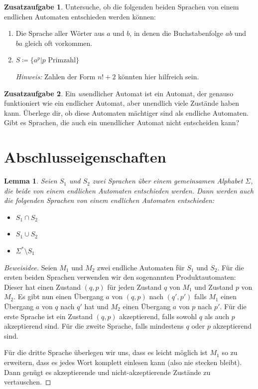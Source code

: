 \documentclass[a4paper,ngerman,12pt]{scrartcl}
\theoremstyle{definition}
\newtheorem{zaufg}{Zusatzaufgabe}
\theoremstyle{plain}
\newtheorem{lemma}[defn]{Lemma}
\theoremstyle{remark}
\begin{document}
\begin{zaufg}
	Untersuche, ob die folgenden beiden Sprachen von einem endlichen Automaten entschieden werden können:
	\begin{enumerate}[label=\alph*)]
		\item Die Sprache aller Wörter aus $a$ und $b$, in denen die Buchstabenfolge $ab$ und $ba$ gleich oft vorkommen.
		\item $S \coloneqq \{a^p | p \text{ Primzahl}\}$
		
		\textit{Hinweis:} Zahlen der Form $n!+2$ könnten hier hilfreich sein.		
	\end{enumerate}
\end{zaufg}

\begin{zaufg}
	Ein \emph{un}endlicher Automat ist ein Automat, der genauso funktioniert wie ein endlicher Automat, aber unendlich viele Zustände haben kann. Überlege dir, ob diese Automaten mächtiger sind als endliche Automaten. Gibt es Sprachen, die auch ein unendlicher Automat nicht entscheiden kann?
\end{zaufg}

\section{Abschlusseigenschaften}

\begin{lemma}\label{lemma:EAAbschlusseigenschaften}
	Seien $S_1$ und $S_2$ zwei Sprachen über einem gemeinsamen Alphabet $\Sigma$, die beide von einem endlichen Automaten entschieden werden. Dann werden auch die folgenden Sprachen von einem endlichen Automaten entschieden:
	\begin{itemize}
		\item $S_1 \cap S_2$
		\item $S_1 \cup S_2$
		\item $\Sigma^* \setminus S_1$
	\end{itemize}
\end{lemma}

\begin{proof}[Beweisidee]
	Seien $M_1$ und $M_2$ zwei endliche Automaten für $S_1$ und $S_2$. Für die ersten beiden Sprachen verwenden wir den sogenannten Produktautomaten: Dieser hat einen Zustand $(q,p)$ für jeden Zustand $q$ von $M_1$ und Zustand $p$ von $M_2$. Es gibt nun einen Übergang $a$ von $(q,p)$ nach $(q',p')$ falls $M_1$ einen Übergang $a$ von $q$ nach $q'$ hat und $M_2$ einen Übergang $a$ von $p$ nach $p'$. Für die erste Sprache ist ein Zustand $(q,p)$ akzeptierend, falls sowohl $q$ als auch $p$ akzeptierend sind. Für die zweite Sprache, falls mindestens $q$ oder $p$ akzeptierend sind.
	
	Für die dritte Sprache überlegen wir uns, dass es leicht möglich ist $M_1$ so zu erweitern, dass es jedes Wort komplett einlesen kann (also nie stecken bleibt). Dann genügt es akzeptierende und nicht-akzeptierende Zustände zu vertauschen.
\end{proof}
\end{document}
